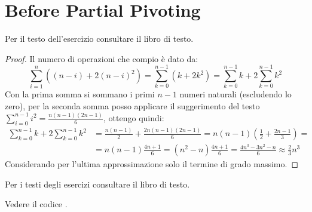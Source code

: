 \section{Before Partial Pivoting}

\begin{exercise}[3.6]
Per il testo dell'esercizio consultare il libro di testo.
\end{exercise}
\begin{proof}
Il numero di operazioni che compio \`e dato da:
\begin{displaymath}
\sum_{i = 1}^{n}{\left( (n-i) + 2(n-i)^{2} \right)} =
\sum_{k = 0}^{n - 1}{\left( k + 2k^{2} \right)} = 
\sum_{k = 0}^{n - 1}{k } + 2\sum_{k = 0}^{n - 1}{k^{2}} 
\end{displaymath}
Con la prima somma si sommano i primi $n-1$ numeri naturali (escludendo lo
zero), per la seconda somma posso applicare il suggerimento del testo 
$\sum_{i = 0}^{n-1}{i^{2}} = \frac{n(n-1)(2n-1)}{6}$, ottengo quindi:
\begin{displaymath}
\begin{split}
\sum_{k = 0}^{n - 1}{k } + 2\sum_{k = 0}^{n - 1}{k^{2}} &= \frac{n(n-1)}{2} +
\frac{2n(n-1)(2n-1)}{6} = n(n-1)\left( \frac{1}{2} + \frac{2n-1}{3}\right ) = \\
&= n(n-1) \frac{4n+1}{6} = (n^{2}-n) \frac{4n+1}{6} = \frac{4n^{3} -3n^{2}-n}{6}
\approx \frac{2}{3}n^{3}
\end{split}
\end{displaymath}
Considerando per l'ultima approssimazione solo il termine di grado massimo.
\end{proof}

\begin{exercise}[3.7, 3.8]
Per i testi degli esercizi consultare il libro di testo.
\end{exercise}
Vedere il codice .

